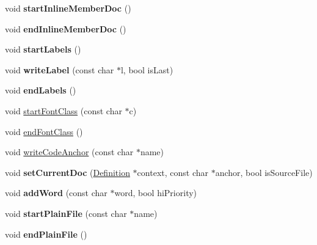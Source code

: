 \begin{DoxyCompactItemize}
\item 
\hypertarget{class_output_list_a2a23f25caeb56aba89bc2b2c4147a2d2}{void {\bfseries start\-Inline\-Member\-Doc} ()}\label{class_output_list_a2a23f25caeb56aba89bc2b2c4147a2d2}

\item 
\hypertarget{class_output_list_a7a50d2a68d8d8805c86482012f422cba}{void {\bfseries end\-Inline\-Member\-Doc} ()}\label{class_output_list_a7a50d2a68d8d8805c86482012f422cba}

\item 
\hypertarget{class_output_list_aa1c00a079e425e24bbbb9291a698cbf2}{void {\bfseries start\-Labels} ()}\label{class_output_list_aa1c00a079e425e24bbbb9291a698cbf2}

\item 
\hypertarget{class_output_list_a4877c6f161162a399bf051570dee0c4a}{void {\bfseries write\-Label} (const char $\ast$l, bool is\-Last)}\label{class_output_list_a4877c6f161162a399bf051570dee0c4a}

\item 
\hypertarget{class_output_list_a26e386d6fcaae518c16e018bee486a61}{void {\bfseries end\-Labels} ()}\label{class_output_list_a26e386d6fcaae518c16e018bee486a61}

\item 
void \hyperlink{class_output_list_a253f5e2755f981e67662b662168aa054}{start\-Font\-Class} (const char $\ast$c)
\item 
void \hyperlink{class_output_list_ab7851025d80a6d1ed6dd8e25016136e1}{end\-Font\-Class} ()
\item 
void \hyperlink{class_output_list_aa813b87ce15931854c2b0b9c1abb9e19}{write\-Code\-Anchor} (const char $\ast$name)
\item 
\hypertarget{class_output_list_a619be3ae6560f96acfc84607ea2d0cd2}{void {\bfseries set\-Current\-Doc} (\hyperlink{class_definition}{Definition} $\ast$context, const char $\ast$anchor, bool is\-Source\-File)}\label{class_output_list_a619be3ae6560f96acfc84607ea2d0cd2}

\item 
\hypertarget{class_output_list_aef206d2620c6a5bc4afcb9a3874dc6b2}{void {\bfseries add\-Word} (const char $\ast$word, bool hi\-Priority)}\label{class_output_list_aef206d2620c6a5bc4afcb9a3874dc6b2}

\item 
\hypertarget{class_output_list_a623f6878d1b90ffef03c07892ba076ab}{void {\bfseries start\-Plain\-File} (const char $\ast$name)}\label{class_output_list_a623f6878d1b90ffef03c07892ba076ab}

\item 
\hypertarget{class_output_list_aae907beb90359ecdfe4086e0a571b8f4}{void {\bfseries end\-Plain\-File} ()}\label{class_output_list_aae907beb90359ecdfe4086e0a571b8f4}

\end{DoxyCompactItemize}
